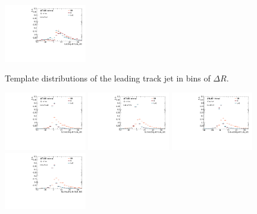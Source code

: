 \begin{figure}[htbp]
 \includegraphics[width=0.32\textwidth]{figures/gbb/Sub_Sd0_Fits/Canv_FitTemplate_06-DeltaR-07_LpT_INF_SpT_INF_x.pdf}\\

\caption{Template \subsdzero distributions of the leading track jet in bins of $\Delta R$. }
  \label{fig:dR-template-leading}
\end{figure}


\begin{figure}[htbp]
  \centering
 \includegraphics[width=0.32\textwidth]{figures/gbb/Sub_Sd0_Fits/Canv_FitTemplate_02-DeltaR-025_LpT_INF_SpT_INF_y.pdf}
 \includegraphics[width=0.32\textwidth]{figures/gbb/Sub_Sd0_Fits/Canv_FitTemplate_025-DeltaR-03_LpT_INF_SpT_INF_y.pdf}
 \includegraphics[width=0.32\textwidth]{figures/gbb/Sub_Sd0_Fits/Canv_FitTemplate_03-DeltaR-04_LpT_INF_SpT_INF_y.pdf}\\
 \includegraphics[width=0.32\textwidth]{figures/gbb/Sub_Sd0_Fits/Canv_FitTemplate_04-DeltaR-05_LpT_INF_SpT_INF_y.pdf}

\end{figure}

